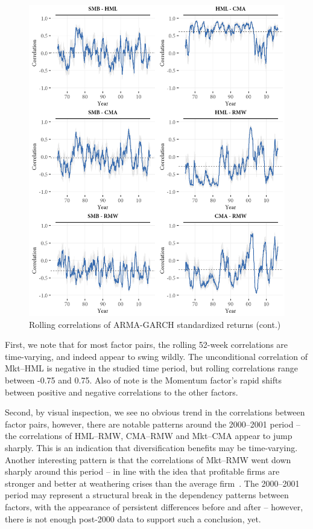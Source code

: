 \begin{figure}[!ht]
  \ContinuedFloat
  \centering
  \caption{Rolling correlations of ARMA-GARCH standardized returns (cont.)}
  \includegraphics[scale=1]{graphics/rolling2.png}  
\end{figure}
First, we note that for most factor pairs, the rolling 52-week correlations are time-varying, and indeed appear to swing wildly. The unconditional correlation of Mkt--HML is negative in the studied time period, but rolling correlations range between -0.75 and 0.75. Also of note is the Momentum factor's rapid shifts between positive and negative correlations to the other factors. 

Second, by visual inspection, we see no obvious trend in the correlations between factor pairs, however, there are notable patterns around the 2000--2001 period -- the correlations of HML--RMW, CMA--RMW and Mkt--CMA appear to jump sharply. This is an indication that diversification benefits may be time-varying. Another interesting pattern is that the correlations of Mkt--RMW went down sharply around this period -- in line with the idea that profitable firms are stronger and better at weathering crises than the average firm~\autocite{NovyMarx2013}. The 2000--2001 period may represent a structural break in the dependency patterns between factors, with the appearance of persistent differences before and after -- however, there is not enough post-2000 data to support such a conclusion, yet.

